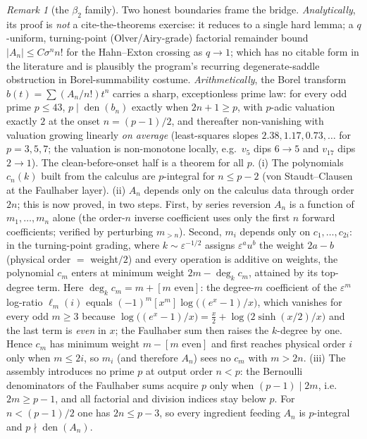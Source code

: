 \documentclass[11pt]{article}
\theoremstyle{plain}
\theoremstyle{definition}
\theoremstyle{remark}
\newtheorem{remark}[theorem]{Remark}
\begin{document}
\begin{remark}[the $\beta_2$ family]
Two honest boundaries frame the bridge. \emph{Analytically}, its proof is \emph{not} a
cite-the-theorems exercise: it reduces to a single hard lemma; a $q$-uniform, turning-point
(Olver/Airy-grade) factorial remainder bound $|A_n|\le C\sigma^nn!$ for the Hahn--Exton crossing as
$q\to1$; which has no citable form in the literature and is plausibly the program's recurring
degenerate-saddle obstruction in Borel-summability costume. \emph{Arithmetically}, the Borel
transform $b(t)=\sum(A_n/n!)t^n$ carries a sharp, exceptionless prime law: for every odd prime
$p\le43$, $p\mid\operatorname{den}(b_n)$ exactly when $2n+1\ge p$, with $p$-adic valuation exactly
$2$ at the onset $n=(p-1)/2$, and thereafter non-vanishing with valuation growing linearly
\emph{on average} (least-squares slopes $2.38,1.17,0.73,\dots$ for $p=3,5,7$; the valuation is
non-monotone locally, e.g.\ $v_5$ dips $6\!\to\!5$ and $v_{17}$ dips $2\!\to\!1$). The clean-before-onset half is a theorem for all $p$. (i) The polynomials $c_n(k)$ built from the
calculus are $p$-integral for $n\le p-2$ (von Staudt--Clausen \cite{IrelandRosen1990} at the Faulhaber layer). (ii) $A_n$
depends only on the calculus data through order $2n$; this is now proved, in two steps. First, by
series reversion $A_n$ is a function of $m_1,\dots,m_n$ alone (the order-$n$ inverse coefficient uses
only the first $n$ forward coefficients; verified by perturbing $m_{>n}$). Second, $m_i$ depends only
on $c_1,\dots,c_{2i}$: in the turning-point grading, where $k\sim\varepsilon^{-1/2}$ assigns
$\varepsilon^au^b$ the weight $2a-b$ (physical order $=$ weight$/2$) and every operation is additive
on weights, the polynomial $c_m$ enters at minimum weight $2m-\deg_k c_m$, attained by its
top-degree term. Here $\deg_k c_m=m+[m\text{ even}]$: the degree-$m$ coefficient of the
$\varepsilon^m$ log-ratio $\ell_m(i)$ equals $(-1)^m[x^m]\log\!\bigl((e^x-1)/x\bigr)$, which vanishes
for every odd $m\ge3$ because $\log\!\bigl((e^x-1)/x\bigr)=\tfrac x2+\log\!\bigl(2\sinh(x/2)/x\bigr)$
and the last term is \emph{even} in $x$; the Faulhaber sum then raises the $k$-degree by one. Hence
$c_m$ has minimum weight $m-[m\text{ even}]$ and first reaches physical order $i$ only when $m\le2i$,
so $m_i$ (and therefore $A_n$) sees no $c_m$ with $m>2n$. (iii) The assembly introduces no
prime $p$ at output order $n<p$: the Bernoulli denominators of the Faulhaber sums acquire $p$ only
when $(p-1)\mid2m$, i.e.\ $2m\ge p-1$, and all factorial and division indices stay below $p$. For
$n<(p-1)/2$ one has $2n\le p-3$, so every ingredient feeding $A_n$ is $p$-integral and
$p\nmid\operatorname{den}(A_n)$.


\end{remark}
\end{document}
